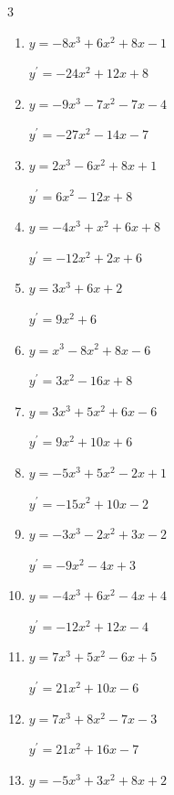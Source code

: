 \begin{multicols}{3}
\begin{enumerate}
  \item $y=-8x^{3}+6x^{2}+8x-1$

        $\displaystyle y^{\prime}=-24x^{2}+12x+8$

  \item $y=-9x^{3}-7x^{2}-7x-4$

        $\displaystyle y^{\prime}=-27x^{2}-14x-7$

  \item $y=2x^{3}-6x^{2}+8x+1$

        $\displaystyle y^{\prime}=6x^{2}-12x+8$

  \item $y=-4x^{3}+x^{2}+6x+8$

        $\displaystyle y^{\prime}=-12x^{2}+2x+6$

  \item $y=3x^{3}+6x+2$

        $\displaystyle y^{\prime}=9x^{2}+6$

  \item $y=x^{3}-8x^{2}+8x-6$

        $\displaystyle y^{\prime}=3x^{2}-16x+8$

  \item $y=3x^{3}+5x^{2}+6x-6$

        $\displaystyle y^{\prime}=9x^{2}+10x+6$

  \item $y=-5x^{3}+5x^{2}-2x+1$

        $\displaystyle y^{\prime}=-15x^{2}+10x-2$

  \item $y=-3x^{3}-2x^{2}+3x-2$

        $\displaystyle y^{\prime}=-9x^{2}-4x+3$

  \item $y=-4x^{3}+6x^{2}-4x+4$

        $\displaystyle y^{\prime}=-12x^{2}+12x-4$

  \item $y=7x^{3}+5x^{2}-6x+5$

        $\displaystyle y^{\prime}=21x^{2}+10x-6$

  \item $y=7x^{3}+8x^{2}-7x-3$

        $\displaystyle y^{\prime}=21x^{2}+16x-7$

\columnbreak %

\resetques

  \item $y=-5x^{3}+3x^{2}+8x+2$


\end{enumerate}
\end{multicols}

